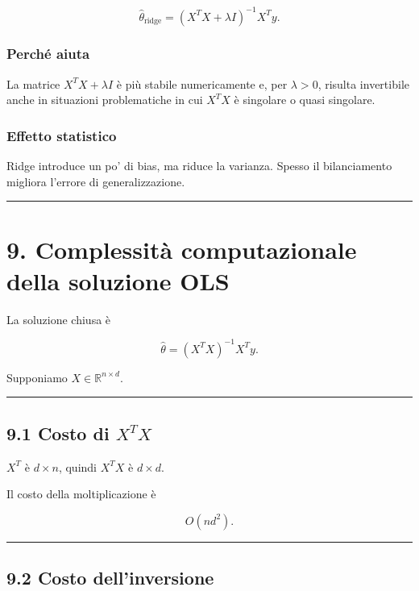 \documentclass[
]{article}
\begin{document}
\[
\hat\theta_{\text{ridge}}=(X^TX+\lambda I)^{-1}X^Ty.
\]

\subsubsection{Perché aiuta}\label{perchuxe9-aiuta}

La matrice \(X^TX+\lambda I\) è più stabile numericamente e, per
\(\lambda>0\), risulta invertibile anche in situazioni problematiche in
cui \(X^TX\) è singolare o quasi singolare.

\subsubsection{Effetto statistico}\label{effetto-statistico}

Ridge introduce un po' di bias, ma riduce la varianza. Spesso il
bilanciamento migliora l'errore di generalizzazione.

\begin{center}\rule{0.5\linewidth}{0.5pt}\end{center}

\section{9. Complessità computazionale della soluzione
OLS}\label{complessituxe0-computazionale-della-soluzione-ols}

La soluzione chiusa è

\[
\hat\theta=(X^TX)^{-1}X^Ty.
\]

Supponiamo \(X\in\mathbb{R}^{n\times d}\).

\begin{center}\rule{0.5\linewidth}{0.5pt}\end{center}

\subsection{\texorpdfstring{9.1 Costo di
\(X^TX\)}{9.1 Costo di X\^{}TX}}\label{costo-di-xtx}

\(X^T\) è \(d\times n\), quindi \(X^TX\) è \(d\times d\).

Il costo della moltiplicazione è

\[
O(nd^2).
\]

\begin{center}\rule{0.5\linewidth}{0.5pt}\end{center}

\subsection{9.2 Costo dell'inversione}\label{costo-dellinversione}
\end{document}
